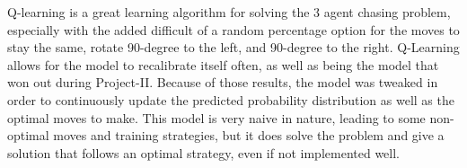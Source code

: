 \documentclass[letterpaper, 10 pt, conference]{ieeeconf}   %
\begin{document}
Q-learning is a great learning algorithm for solving the 3 agent chasing problem, especially with the added difficult of a random percentage option for the moves to stay the same,
rotate 90-degree to the left, and 90-degree to the right. Q-Learning allows for the model to recalibrate itself often, as well as being the model that won out during Project-II. Because of those results,
the model was tweaked in order to continuously update the predicted probability distribution as well as the optimal moves to make. This model is very naive
in nature, leading to some non-optimal moves and training strategies, but it does solve the problem and give a solution that follows an optimal strategy, even if not implemented well.

\addtolength{\textheight}{-12cm}   %









\end{document}

